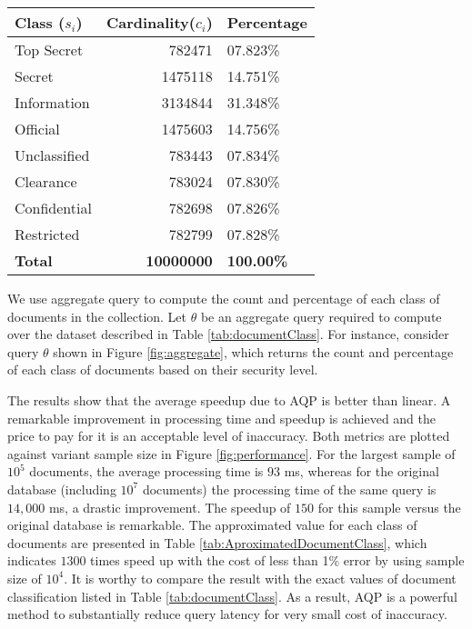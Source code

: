 \begin{table*}[htp]
\caption{Document classification}
\label{tab:documentClass}
\centering
\begin{tabular}{lrl}
\toprule
\textbf{Class ($s_i$)} & \textbf{Cardinality($c_i$)} & \textbf{Percentage}\\
\midrule
Top Secret  & 782471  & 07.823\%  \\ 
Secret      & 1475118 & 14.751\% \\
Information & 3134844 & 31.348\% \\
Official    & 1475603 & 14.756\% \\
Unclassified& 783443  & 07.834\% \\
Clearance   & 783024  & 07.830\% \\
Confidential& 782698  & 07.826\% \\
Restricted  & 782799  & 07.828\% \\
\midrule
\textbf{Total}  & \textbf{10000000}  & \textbf{100.00\%} \\
\bottomrule
\end{tabular}
\end{table*}

We use aggregate query to compute the count and percentage of each class of documents in the collection. Let $\theta$ be an aggregate query required to compute over the dataset described in Table \ref{tab:documentClass}. For instance, consider query $\theta$ shown in Figure \ref{fig:aggregate}, which returns the count and percentage of each class of documents based on their security level.




The results show that the average speedup due to AQP is better than linear. A remarkable improvement in processing time and speedup is achieved and the price to pay for it is an acceptable level of inaccuracy. Both metrics are plotted against variant sample size in Figure \ref{fig:performance}. For the largest sample of $10^5$ documents, the average processing time is $93$ ms, whereas for the original database (including $10^7$ documents) the processing time of the same query is $14,000$ ms, a drastic improvement. The speedup of $150$ for this sample versus  the original database is remarkable. The approximated value for each class of documents are presented in Table \ref{tab:AproximatedDocumentClass}, which indicates $1300$ times speed up with the cost of less than 1\% error by using sample size of $10^4$. It is worthy to compare the result with the exact values of document classification listed in Table \ref{tab:documentClass}. As a result, AQP is a powerful method to substantially reduce query latency for very small cost of inaccuracy.  
 
